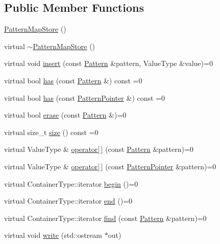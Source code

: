\subsection*{Public Member Functions}
\begin{DoxyCompactItemize}
\item 
\hyperlink{classPatternMapStore_af246953d72bedb9ef3741eddb1768ff6}{Pattern\+Map\+Store} ()
\item 
virtual \hyperlink{classPatternMapStore_aa15df2207721ea9d43952add6e5a1ebc}{$\sim$\+Pattern\+Map\+Store} ()
\item 
virtual void \hyperlink{classPatternMapStore_a37bcf7aae1c40ccdea57e9a57533a555}{insert} (const \hyperlink{classPattern}{Pattern} \&pattern, Value\+Type \&value)=0
\item 
virtual bool \hyperlink{classPatternMapStore_ad9c07c57785e95edbe057e79f94be2c9}{has} (const \hyperlink{classPattern}{Pattern} \&) const  =0
\item 
virtual bool \hyperlink{classPatternMapStore_a00d47f8640efaeb3ce85558b3ee4a6a2}{has} (const \hyperlink{classPatternPointer}{Pattern\+Pointer} \&) const  =0
\item 
virtual bool \hyperlink{classPatternMapStore_a60f2926144fbd408b86d9ff5481fd140}{erase} (const \hyperlink{classPattern}{Pattern} \&)=0
\item 
virtual size\+\_\+t \hyperlink{classPatternMapStore_ab6dc590b4b102f1464301a3fc6c4ec73}{size} () const  =0
\item 
virtual Value\+Type \& \hyperlink{classPatternMapStore_ac4e8b5a15bb4e3d0f205a979f0d272ab}{operator\mbox{[}$\,$\mbox{]}} (const \hyperlink{classPattern}{Pattern} \&pattern)=0
\item 
virtual Value\+Type \& \hyperlink{classPatternMapStore_ac4f6c5ef2bd7397a33adeb2e72f6d38c}{operator\mbox{[}$\,$\mbox{]}} (const \hyperlink{classPatternPointer}{Pattern\+Pointer} \&pattern)=0
\item 
virtual Container\+Type\+::iterator \hyperlink{classPatternMapStore_a2a0a8463a6faa2f2b6636167c06e19af}{begin} ()=0
\item 
virtual Container\+Type\+::iterator \hyperlink{classPatternMapStore_a363c63981ea34474b28b2e3a95d376ce}{end} ()=0
\item 
virtual Container\+Type\+::iterator \hyperlink{classPatternMapStore_ae50e3cdbbf9a503d3381971daec92b54}{find} (const \hyperlink{classPattern}{Pattern} \&pattern)=0
\item 
virtual void \hyperlink{classPatternMapStore_aa672214575c57ba24f51996e1eb26902}{write} (std\+::ostream $\ast$out)

\end{DoxyCompactItemize}
